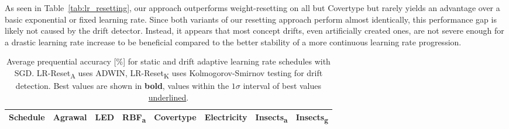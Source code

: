 \documentclass{article} %
\begin{document}
As seen in Table~\ref{tab:lr_resetting}, our approach outperforms weight-resetting on all but Covertype but rarely yields an advantage over a basic exponential or fixed learning rate.
Since both variants of our resetting approach perform almost identically, this performance gap is likely not caused by the drift detector.
Instead, it appears that most concept drifts, even artificially created ones, are not severe enough for a drastic learning rate increase to be beneficial compared to the better stability of a more continuous learning rate progression.


\begin{table}[ht]
   \centering
   \small
   \caption{Average prequential accuracy [\%] for static and drift adaptive learning rate schedules with SGD. LR-Reset\textsubscript{A} uses ADWIN, LR-Reset\textsubscript{K} uses Kolmogorov-Smirnov testing for drift detection. Best values are shown in \textbf{bold}, values within the $1\sigma$ interval of best values \underline{underlined}.}
   \begin{tabular}{llllllll}
      \toprule
      Schedule                  & Agrawal                    & LED                      & RBF\textsubscript{a}       & Covertype                  & Electricity                & Insects\textsubscript{a}   & Insects\textsubscript{g}   \\
      \midrule


\end{tabular}
\end{table}
\end{document}

